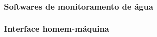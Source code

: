 
\subsubsection{Softwares de monitoramento de água}

    
  
% 
%   
  
\subsubsection{Interface homem-máquina}

  